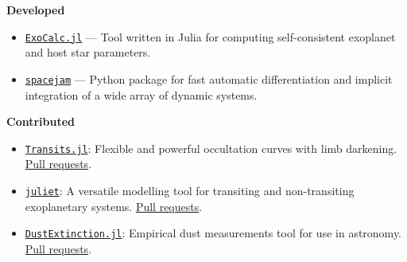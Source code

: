 
\textbf{Developed}
    \begin{itemize}
        \item \href{https://icweaver.github.io/ExoCalc.jl/}{\texttt{ExoCalc.jl}} --- Tool written in Julia for computing self-consistent exoplanet and host star parameters.
    	\item \href{https://spacejam.readthedocs.io/en/latest/}{\texttt{spacejam}} --- Python package for fast automatic differentiation
    	and implicit integration of a wide array of dynamic systems.
	\end{itemize}
	
	\textbf{Contributed}
    \begin{itemize}
    \item \href{https://juliaastro.github.io/Transits.jl/stable/}{\texttt{Transits.jl}}: Flexible and powerful occultation curves with limb darkening. \href{https://github.com/JuliaAstro/Transits.jl/pulls?q=is\%3Apr+author\%3Aicweaver+}{Pull requests}.
	\item \href{https://juliet.readthedocs.io/en/latest/}{\texttt{juliet}}: A versatile modelling tool for transiting and non-transiting exoplanetary systems. \href{https://github.com/nespinoza/juliet/pulls?q=is\%3Apr+author\%3Aicweaver}{Pull requests}.
	\item \href{https://juliaastro.github.io/DustExtinction.jl/stable/}{\texttt{DustExtinction.jl}}: Empirical dust measurements tool for use in astronomy.
	\href{https://github.com/JuliaAstro/DustExtinction.jl/pulls?q=is\%3Apr+author\%3Aicweaver}{Pull requests}.
	\end{itemize}